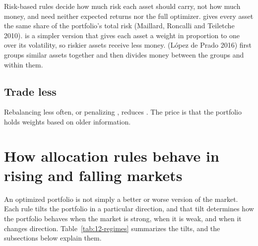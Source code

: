 Risk-based rules decide how much risk each asset should carry, not how much money, and need neither expected returns nor the full optimizer.  gives every asset the same share of the portfolio's total risk (Maillard, Roncalli and Teiletche 2010).  is a simpler version that gives each asset a weight in proportion to one over its volatility, so riskier assets receive less money.  (L\'opez de Prado 2016) first groups similar assets together and then divides money between the groups and within them.

\subsection{Trade less}

Rebalancing less often, or penalizing , reduces . The price is that the portfolio holds weights based on older information.


\section{How allocation rules behave in rising and falling markets}
\label{sec:12-regimes}

An optimized portfolio is not simply a better or worse version of the market. Each rule tilts the portfolio in a particular direction, and that tilt determines how the portfolio behaves when the market is strong, when it is weak, and when it changes direction. Table~\ref{tab:12-regimes} summarizes the tilts, and the subsections below explain them.

